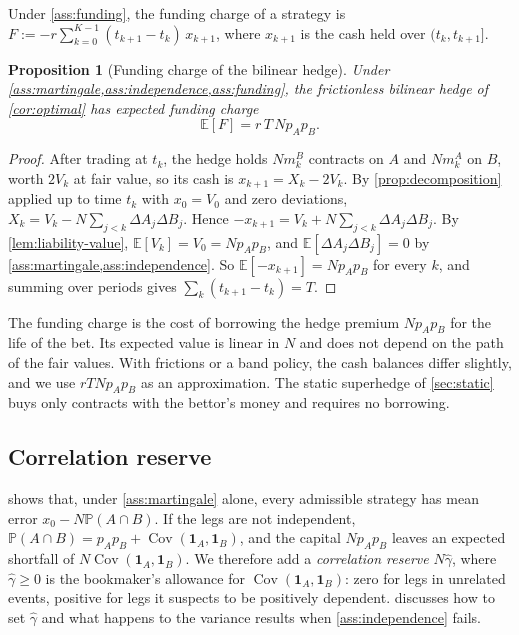 \documentclass[11pt,a4paper]{article}
\theoremstyle{plain}
\newtheorem{proposition}[theorem]{Proposition}
\theoremstyle{definition}
\theoremstyle{remark}
\newcommand{\E}{\mathbb{E}}
\newcommand{\Prob}{\mathbb{P}}
\newcommand{\1}{\mathbf{1}}
\newcommand{\Cov}{\operatorname{Cov}}
\begin{document}
Under \cref{ass:funding}, the funding charge of a strategy is $F := -r\sum_{k=0}^{K-1}(t_{k+1}-t_k)\,x_{k+1}$, where $x_{k+1}$ is the cash held over $(t_k,t_{k+1}]$.

\begin{proposition}[Funding charge of the bilinear hedge]
\label{prop:funding}
Under \cref{ass:martingale,ass:independence,ass:funding}, the frictionless bilinear hedge of \cref{cor:optimal} has expected funding charge
\[
\E[F] = r\,T\,Np_Ap_B.
\]
\end{proposition}

\begin{proof}
After trading at $t_k$, the hedge holds $Nm^B_k$ contracts on $A$ and $Nm^A_k$ on $B$, worth $2V_k$ at fair value, so its cash is $x_{k+1} = X_k - 2V_k$. By \cref{prop:decomposition} applied up to time $t_k$ with $x_0 = V_0$ and zero deviations, $X_k = V_k - N\sum_{j<k}\Delta A_j\Delta B_j$. Hence $-x_{k+1} = V_k + N\sum_{j<k}\Delta A_j\Delta B_j$. By \cref{lem:liability-value}, $\E[V_k] = V_0 = Np_Ap_B$, and $\E[\Delta A_j\Delta B_j] = 0$ by \cref{ass:martingale,ass:independence}. So $\E[-x_{k+1}] = Np_Ap_B$ for every $k$, and summing over periods gives $\sum_k(t_{k+1}-t_k) = T$.
\end{proof}

The funding charge is the cost of borrowing the hedge premium $Np_Ap_B$ for the life of the bet. Its expected value is linear in $N$ and does not depend on the path of the fair values. With frictions or a band policy, the cash balances differ slightly, and we use $rTNp_Ap_B$ as an approximation. The static superhedge of \cref{sec:static} buys only contracts with the bettor's money and requires no borrowing.

\subsection{Correlation reserve}

 shows that, under \cref{ass:martingale} alone, every admissible strategy has mean error $x_0 - N\Prob(A\cap B)$. If the legs are not independent, $\Prob(A\cap B) = p_Ap_B + \Cov(\1_A,\1_B)$, and the capital $Np_Ap_B$ leaves an expected shortfall of $N\Cov(\1_A,\1_B)$. We therefore add a \emph{correlation reserve} $N\hat\gamma$, where $\hat\gamma\geq 0$ is the bookmaker's allowance for $\Cov(\1_A,\1_B)$: zero for legs in unrelated events, positive for legs it suspects to be positively dependent.  discusses how to set $\hat\gamma$ and what happens to the variance results when \cref{ass:independence} fails.
\end{document}
